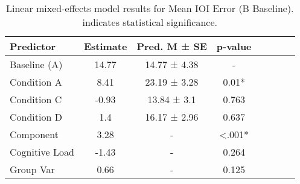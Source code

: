 
    \begin{table}[H]
    \centering
    \begin{small}
    \begin{tabular}{lccccccc}
\toprule
Predictor & Estimate & Pred. M ± SE & p-value \\
\midrule
Baseline (A) & 14.77 & 14.77 ± 4.38 & - \\
Condition A & 8.41 & 23.19 ± 3.28 & 0.01* \\
Condition C & -0.93 & 13.84 ± 3.1 & 0.763 \\
Condition D & 1.4 & 16.17 ± 2.96 & 0.637 \\
Component & 3.28 & - & <.001* \\
Cognitive Load & -1.43 & - & 0.264 \\
Group Var & 0.66 & - & 0.125 \\
\bottomrule
\end{tabular}

    \end{small}
    \caption[Linear mixed-effects model results for Mean IOI Error (B Baseline)]{Linear mixed-effects model results for Mean IOI Error (B Baseline). \newline * indicates statistical significance.}
    \label{tab:meanioierror (b baseline)}

    \end{table}